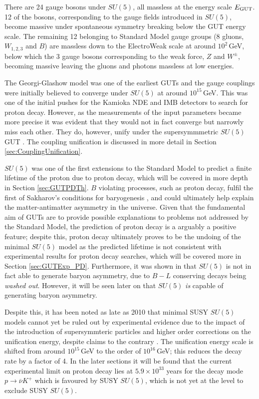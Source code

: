 \documentclass{article}
\begin{document}
There are 24 gauge bosons under $SU(5)$, all massless at the energy scale $E_{\rm{GUT}}$. 12 of the bosons, corresponding to the gauge fields introduced in $SU(5)$, become massive under spontaneous symmetry breaking below the GUT energy scale. The remaining 12 belonging to Standard Model gauge groups (8 gluons,$W_{1,2,3}$ and $B$) are massless down to the ElectroWeak scale at around $10^2\,$GeV, below which the 3 gauge bosons corresponding to the weak force, $Z$ and $W^{\pm}$, becoming massive leaving the gluons and photons massless at low energies.

The Georgi-Glashow model was one of the earliest GUTs and the gauge couplings were initially believed to converge under $SU(5)$ at around $10^{15}\,$GeV. This was one of the initial pushes for the Kamioka NDE and IMB detectors to search for proton decay. However, as the measurements of the input parameters became more precise it was evident that they would not in fact converge but narrowly miss each other. They do, however, unify under the supersymmmetric $SU(5)$ GUT \cite{SUSYSU5CouplingUnification}. The coupling unification is discussed in more detail in Section \ref{sec:CouplingUnification}.

$SU(5)$ was one of the first extensions to the Standard Model to predict a finite lifetime of the proton due to proton decay, which will be covered in more depth in Section \ref{sec:GUTPDTh}. $B$ violating processes, such as proton decay, fulfil the first of Sakharov's conditions for baryogenesis \cite{SakharovConditions}, and could ultimately help explain the matter-antimatter asymmetry in the universe. Given that the fundamental aim of GUTs are to provide possible explanations to problems not addressed by the Standard Model, the prediction of proton decay is a arguably a positive feature; despite this, proton decay ultimately proves to be the undoing of the minimal $SU(5)$ model as the predicted lifetime is not consistent with experimental results for proton decay searches, which will be covered more in Section \ref{sec:GUTExp_PD}. Furthermore, it was shown in \cite{GUTSphaleron} that $SU(5)$ is not in fact able to generate baryon asymmetry, due to $B-L$ conserving decays being \textit{washed out}. However, it will be seen later on that $SU(5)$ \textit{is} capable of generating baryon asymmetry.

Despite this, it has been noted as late as 2010 that minimal SUSY $SU(5)$ models  cannot yet be ruled out by experimental evidence \cite{SuperK2014} due to the impact of the introduction of supersymmteric particles and higher order corrections on the unification energy\cite{SUSYSU5Decay}, despite claims to the contrary \cite{PDMinimalSUSYSU5}. The unification energy scale is shifted from around $10^{15}\,$GeV to the order of $10^{16}\,$GeV; this reduces the decay rate by a factor of 4. In the later sections it will be found that the current experimental limit on proton decay lies at $5.9\times10^{33}$ years for the decay mode $p\rightarrow \overline{\nu}K^+$ which is favoured by SUSY $SU(5)$, which is not yet at the level to exclude SUSY $SU(5)$.
\end{document}
